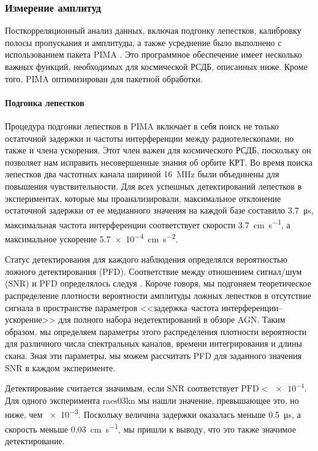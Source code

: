 \subsubsection{Измерение амплитуд}

Посткорреляционный анализ данных, включая подгонку лепестков, калибровку полосы пропускания
и амплитуды, а также усреднение было выполнено с использованием пакета PIMA \cite{Petrov_2011}. Это
программное обеспечение имеет несколько важных функций, необходимых для космической РСДБ, описанных
ниже. Кроме того, PIMA оптимизирован для пакетной обработки.

\paragraph{Подгонка лепестков}

Процедура подгонки лепестков в PIMA включает в себя поиск не только остаточной задержки и частоты
интерференции между радиотелескопами, но также и члена ускорения. Этот член важен для
космического РСДБ, поскольку он позволяет нам исправить несовершенные знания об орбите КРТ. Во время
поиска лепестков два частотных канала шириной \SI{16}{\MHz} были объединены для повышения
чувствительности. Для всех успешных детектирований лепестков в экспериментах, которые мы
проанализировали, максимальное отклонение остаточной задержки от ее медианного значения на каждой
базе составило \SI{3.7}{\us}, максимальная частота интерференции соответствует скорости
\SI{3.7}{\cm\per\second}, а максимальное ускорение \SI{5.7e-4}{\cm\per\second^2}.

Статус детектирования для каждого наблюдения определялся вероятностью ложного детектирования (PFD).
Соответствие между отношением сигнал/шум (SNR) и PFD определялось следуя \cite{Petrov_2011}. Короче
говоря, мы подгоняем теоретическое распределение плотности вероятности амплитуды ложных лепестков в
отсутствие сигнала в пространстве параметров <<задержка--частота интерференции--ускорение>> для
полного набора недетектирований в обзоре AGN. Таким образом, мы определяем параметры этого
распределения плотности вероятности для различного числа спектральных каналов, времени
интегрирования и длины скана. Зная эти параметры, мы можем рассчитать PFD для заданного значения SNR
в каждом эксперименте.

Детектирование считается значимым, если SNR соответствует $\text{PFD}<\num{e-4}$. Для одного
эксперимента raes03kn мы нашли значение, превышающее это, но ниже, чем \num{e-3}. Поскольку величина
задержки оказалась меньше \SI{0.5}{\us}, а скорость меньше \SI{0.03}{\cm\per\second}, мы пришли к
выводу, что это также значимое детектирование.

